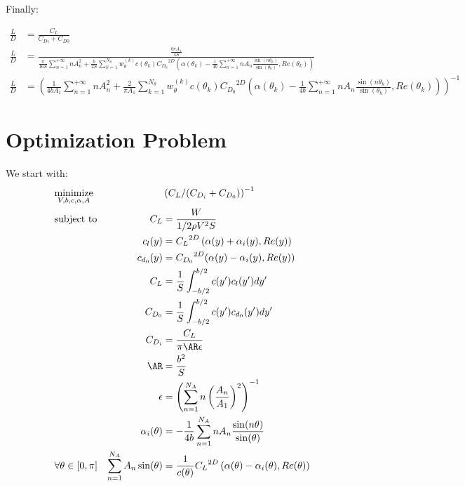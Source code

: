 \documentclass[letterpaper,12pt]{article}
\begin{document}
Finally:

\begin{align}
	\label{eq:ld}
	\frac L D &= \frac {C_L} 
	{C_{Di} + C_{D0}} \nonumber \\
	\frac L D &= \frac{\frac{b \pi A_1}{4S}}{
		\frac {\pi}{16S} \sum_{n=1}^{+\infty} n A_{n}^2 + 
		\frac b {2S} \sum_{k=1}^{N_{\theta}} w_{\theta}^{(k)} c(\theta_k) {C_{D_0}}^{2D}\left( \alpha(\theta_k) - \frac {1}{4b} \sum_{n=1}^{+\infty} n A_n \frac{ \sin(n\theta_k) }{\sin(\theta_k)} , Re(\theta_k)\right)
	} \nonumber \\
	\frac L D &= \left(	\frac {1}{4bA_1} \sum_{n=1}^{+\infty} n A_{n}^2 + 
		\frac {2} {\pi A_1} \sum_{k=1}^{N_{\theta}} w_{\theta}^{(k)} c(\theta_k) {C_{D_0}}^{2D}\left( \alpha(\theta_k) - \frac {1}{4b} \sum_{n=1}^{+\infty} n A_n \frac{ \sin(n\theta_k) }{\sin(\theta_k)} , Re(\theta_k)\right) 
	\right)^{-1} 
\end{align}


\section{Optimization Problem}

We start with:
\begin{align*}
	& \underset{V, b, c, \alpha, A}{\text{minimize}}
	& & \left( C_L / (C_{D_i} + C_{D_0})\right)^{-1} \nonumber \\
	& \text{subject to} 
	& C_L &= \frac{W}{1/2 \rho V^2 S} \\
	& & c_l(y) &= {C_L}^{2D} \left( \alpha(y) + \alpha_i(y), Re(y)\right) \\
	& & c_{d_0}(y) &= {C_{D_0}}^{2D}(\alpha(y) - \alpha_i(y), Re(y)) \\
	& & C_L &= \frac 1 S \int_{-b/2}^{b/2} c(y') c_l(y') dy'\\
	& & C_{D_0} &= \frac 1 S \int_{-b/2}^{b/2} c(y') c_{d_0}(y') dy'\\
	& & C_{D_i} & = \frac{C_L}{\pi \AR \epsilon} \\
	& & \AR &= \frac{b^2}{S} \\
	& & \epsilon &= \left(\sum_{n=1}^{N_A} n \left(\frac{A_n}{A_1}\right)^2 \right)^{-1} \\
	& & \alpha_i(\theta) &= -\frac 1 {4b} \sum_{n=1}^{N_A} n A_n\frac{\sin(n\theta)}{\sin(\theta)} \\
	& \forall \theta \in [0, \pi] & \sum_{n=1}^{N_A} A_n \sin(\theta) &= \frac{1}{c(\theta)} {C_L}^{2D} \left( \alpha(\theta) - \alpha_i(\theta), Re(\theta)\right) \\
\end{align*}
\end{document}
